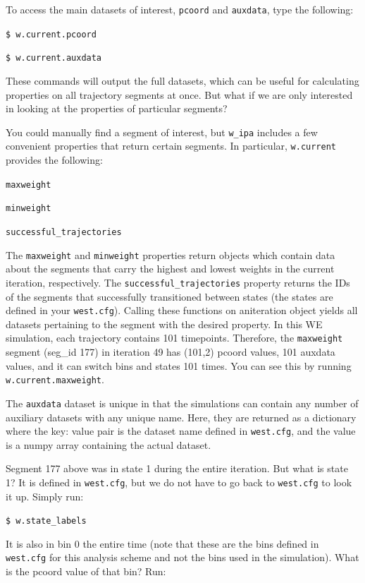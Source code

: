 \documentclass[9pt,tutorial]{livecoms}
\begin{document}
To access the main datasets of interest, \verb|pcoord| and \verb|auxdata|, type the following: 

\verb|$ w.current.pcoord|

\verb|$ w.current.auxdata|

These commands will output the full datasets, which can be useful for calculating properties on all trajectory segments at once. 
But what if we are only interested in looking at the properties of particular segments?

You could manually find a segment of interest, but \verb|w_ipa| includes a few convenient properties that return certain segments. 
In particular, \verb|w.current| provides the following:

\verb|maxweight|

\verb|minweight|

\verb|successful_trajectories|

The \verb|maxweight| and \verb|minweight| properties return objects which contain data about the segments that carry the highest and lowest weights in the current iteration, respectively. 
The \verb|successful_trajectories| property returns the IDs of the segments that successfully transitioned between states  (the states are defined in your \verb|west.cfg|). 
Calling these functions on aniteration object yields all datasets pertaining to the segment with the desired property. 
In this WE simulation, each trajectory contains 101 timepoints. 
Therefore, the \verb|maxweight| segment (seg\_id 177) in iteration 49 has (101,2) pcoord values, 101 auxdata values, and it can switch bins and states 101 times. 
You can see this by running \verb|w.current.maxweight|.
 
The \verb|auxdata| dataset is unique in that the simulations can contain any number of auxiliary datasets with any unique name. 
Here, they are returned as a dictionary where the key: value pair is the dataset name defined in \verb|west.cfg|, and the value is a numpy array containing the actual dataset.

Segment 177 above was in state 1 during the entire iteration. 
But what is state 1? 
It is defined in \verb|west.cfg|, but we do not have to go back to \verb|west.cfg| to look it up. 
Simply run:

\verb|$ w.state_labels|

It is also in bin 0 the entire time (note that these are the bins defined in \verb|west.cfg| for this analysis scheme and not the bins used in the simulation). 
What is the pcoord value of that bin? Run:
\end{document}

